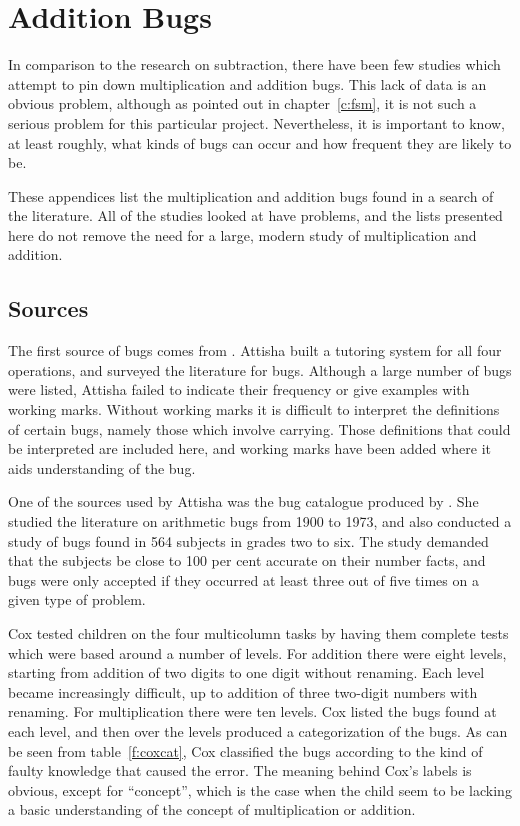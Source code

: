 \chapter[Addition bugs]{Addition Bugs}\label{c:aa}


In comparison to the research on subtraction, there have been few studies
which attempt to pin down multiplication and addition bugs. This lack of
data is an obvious problem, although as pointed out in
chapter~\ref{c:fsm}, it is not such a serious problem for this particular
project. Nevertheless, it is
important to know, at least roughly, what kinds
of bugs can occur and how frequent they are likely to be.


These appendices list the multiplication and addition bugs found in a
search of the literature.  All of the studies looked at have problems, and
the lists presented here do not remove the need for a large, modern study
of multiplication and addition.

\section{Sources}

\newbox\tcb
\setbox\tcb\hbox{}

The first source of bugs comes from .
Attisha built a tutoring system for all four operations, and surveyed the
literature for bugs. Although a large number of bugs were listed, Attisha
failed to indicate their frequency or give examples with working marks.
Without working marks it is difficult to interpret the definitions of
certain bugs, namely
those which involve carrying.  Those definitions that
could be interpreted are included here, and working marks have been added
where it aids understanding of the bug.

One of the sources used by Attisha was the bug catalogue produced by
.  She studied the literature on arithmetic bugs from 1900
to 1973, and also conducted a study of bugs found in 564 subjects in grades
two to six.   The study demanded that the subjects be close to 100
per cent accurate on their number facts, and bugs
were only accepted if they
occurred at least three out of five times on a given type of problem.

Cox tested children on the four multicolumn tasks by having them complete
tests which were based around a number of levels.  For addition there were
eight levels, starting from addition of two digits to one digit without
renaming. Each level became increasingly difficult, up to addition of three
two-digit numbers with renaming. For multiplication there were ten levels.
Cox listed the bugs found at each level, and then over the levels produced
a categorization of the bugs.  As can be seen from table~\ref{f:coxcat},
Cox classified the bugs according to the kind of faulty knowledge that
caused the error. The meaning behind Cox's labels is obvious, except for
``concept'', which is the case when the child seem to be lacking a basic
understanding of the concept of multiplication or addition.

